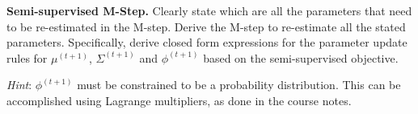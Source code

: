 \item{} \textbf{Semi-supervised M-Step.}
Clearly state which are all the parameters that need to be re-estimated in the M-step.
Derive the M-step to re-estimate all the stated parameters. 
Specifically, derive closed form expressions for the parameter update rules for $\mu^{(t+1)}$, $\Sigma^{(t+1)}$ and $\phi^{(t+1)}$ based on the semi-supervised objective.

\textit{Hint}: $\phi^{(t+1)}$ must be constrained to be a probability distribution. This can be accomplished using Lagrange multipliers, as done in the course notes.